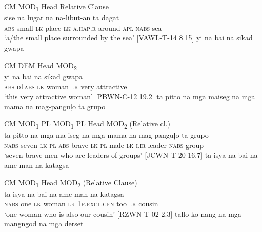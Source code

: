 CM  MOD\textsubscript{1} \hspace{6pt} Head \hspace{12pt}   Relative Clause \\
\gll \emptyset{}  sise  na  lugar  na  na-libut-an  ta  dagat \\
\textsc{abs} small  \textsc{lk}  place  \textsc{lk}  \textsc{a.hap.r}-around-\textsc{apl}  \textsc{nabs}  sea \\
\glt ‘a/the small place surrounded by the sea’ [VAWL-T-14 8.15]
\z
\ea
\emptyset{}  yi  na  bai  na  sikad  gwapa \\\smallskip

CM  DEM \hspace{13pt}   Head \hspace{22pt}   MOD\textsubscript{2} \\
\gll \emptyset{}  yi  na  bai  na  sikad  gwapa \\
\textsc{abs} \textsc{d}1\textsc{abs}  \textsc{lk}  woman  \textsc{lk}  very  attractive \\
\glt ‘this very attractive woman’ [PBWN-C-12 19.2]
\z
\ea
\label{bkm:Ref363460123}
ta  pitto  na  mga  maiseg  na  mga  mama  na  mag-panguļo  ta  grupo \\\smallskip

CM \hspace{4pt} MOD\textsubscript{1} \hspace{8pt} PL \hspace{4pt} MOD\textsubscript{1}  \hspace{29pt}  PL \hspace{7pt} Head \hspace{14pt}   MOD\textsubscript{2} (Relative cl.) \\
\gll ta  pitto  na  mga  ma-iseg  na  mga  mama  na  mag-panguļo  ta  grupo \\
\textsc{nabs}  seven  \textsc{lk}  \textsc{pl}  \textsc{abs}-brave  \textsc{lk}  \textsc{pl}  male  \textsc{lk}  \textsc{i.ir}-leader  \textsc{nabs}  group \\
\glt ‘seven brave men who are leaders of groups’ [JCWN-T-20 16.7]
\z
\ea
\label{bkm:Ref447702060}
ta  isya  na  bai  na  ame  man  na  katagsa \\\smallskip

CM \hspace{4pt} MOD\textsubscript{1} \hspace{1pt} Head \hspace{19pt} MOD\textsubscript{2} (Relative Clause) \\
\gll ta  isya  na  bai  na  ame  man  na  katagsa \\
\textsc{nabs}  one  \textsc{lk}  woman  \textsc{lk}  1\textsc{p.excl.gen}  too  \textsc{lk}  cousin \\
\glt ‘one woman who is also our cousin’ [RZWN-T-02 2.3]
\z
\ea
tallo  ko  nang  na  mga  mangngod  na  mga  derset \\\smallskip

